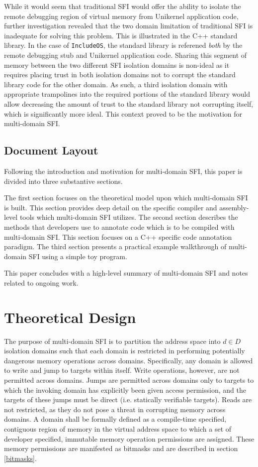 \documentclass[12pt]{IEEEtran}
\begin{document}
While it would seem that traditional SFI would offer the ability to isolate the remote debugging region of virtual memory from Unikernel application code, further investigation revealed that the two domain limitation of traditional SFI is inadequate for solving this problem. This is illustrated in the C++ standard library. In the case of \texttt{IncludeOS}, the standard library is referened \textit{both} by the remote debugging stub and Unikernel application code. Sharing this segment of memory between the two different SFI isolation domains is non-ideal as it requires placing trust in both isolation domains not to corrupt the standard library code for the other domain. As such, a third isolation domain with appropriate trampolines into the required portions of the standard library would allow decreasing the amount of trust to the standard library not corrupting itself, which is significantly more ideal. This context proved to be the motivation for multi-domain SFI.

\subsection{Document Layout}

Following the introduction and motivation for multi-domain SFI, this paper is divided into three substantive sections.

The first section focuses on the theoretical model upon which multi-domain SFI is built. This section provides deep detail on the specific compiler and assembly-level tools which multi-domain SFI utilizes. The second section describes the methods that developers use to annotate code which is to be compiled with multi-domain SFI. This section focuses on a C++ specific code annotation paradigm. The third section presents a practical example walkthrough of multi-domain SFI using a simple toy program.

This paper concludes with a high-level summary of multi-domain SFI and notes related to ongoing work.

\section{Theoretical Design}

The purpose of multi-domain SFI is to partition the address space into $d\in D$ isolation domains such that each domain is restricted in performing potentially dangerous memory operations across domains. Specifically, any domain is allowed to write and jump to targets within itself. Write operations, however, are not permitted across domains. Jumps are permitted across domains only to targets to which the invoking domain has explicitly been given access permission, and the targets of these jumps must be direct (i.e. statically verifiable targets). Reads are not restricted, as they do not pose a threat in corrupting memory across domains.  A domain shall be formally defined as a compile-time specified, contiguous region of memory in the virtual address space to which a set of developer specified, immutable memory operation permissions are assigned. These memory permissions are manifested as bitmasks and are described in section \ref{bitmasks}.
\end{document}
